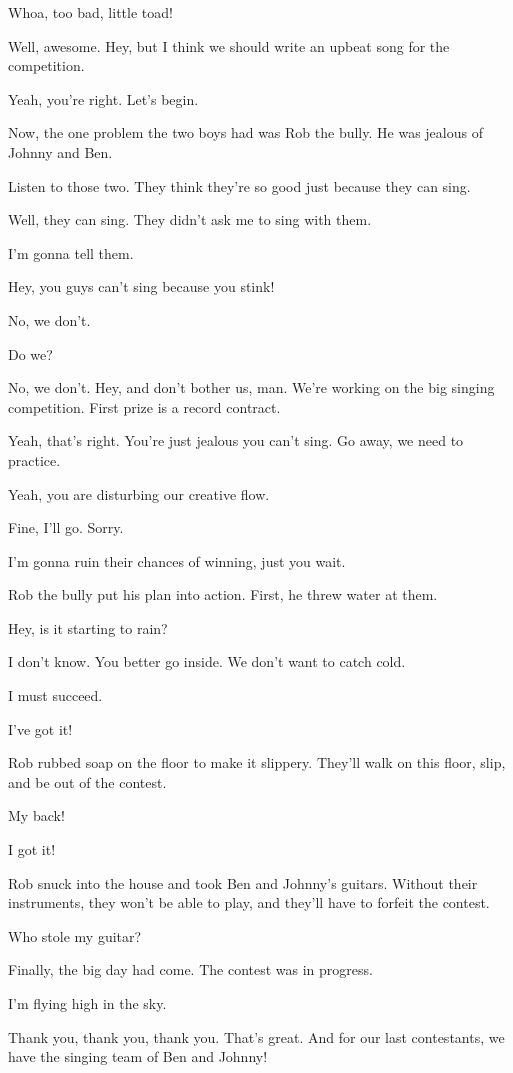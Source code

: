 Whoa, too bad, little toad!

Well, awesome.
Hey, but I think we should write an upbeat song for the competition.

Yeah, you're right.
Let's begin.

Now, the one problem the two boys had was Rob the bully.
He was jealous of Johnny and Ben.

Listen to those two.
They think they're so good just because they can sing.

Well, they can sing.
They didn't ask me to sing with them.

I'm gonna tell them.

Hey, you guys can't sing because you stink!

No, we don't.

Do we?

No, we don't.
Hey, and don't bother us, man.
We're working on the big singing competition.
First prize is a record contract.

Yeah, that's right.
You're just jealous you can't sing.
Go away, we need to practice.

Yeah, you are disturbing our creative flow.

Fine, I'll go.
Sorry.

I'm gonna ruin their chances of winning, just you wait.

Rob the bully put his plan into action.
First, he threw water at them.

Hey, is it starting to rain?

I don't know.
You better go inside.
We don't want to catch cold.

I must succeed.

I've got it!

Rob rubbed soap on the floor to make it slippery.
They'll walk on this floor, slip, and be out of the contest.

My back!

I got it!

Rob snuck into the house and took Ben and Johnny's guitars.
Without their instruments, they won't be able to play, and they'll have to forfeit the contest.

Who stole my guitar?

Finally, the big day had come.
The contest was in progress.

I'm flying high in the sky.

Thank you, thank you, thank you.
That's great.
And for our last contestants, we have the singing team of Ben and Johnny!

